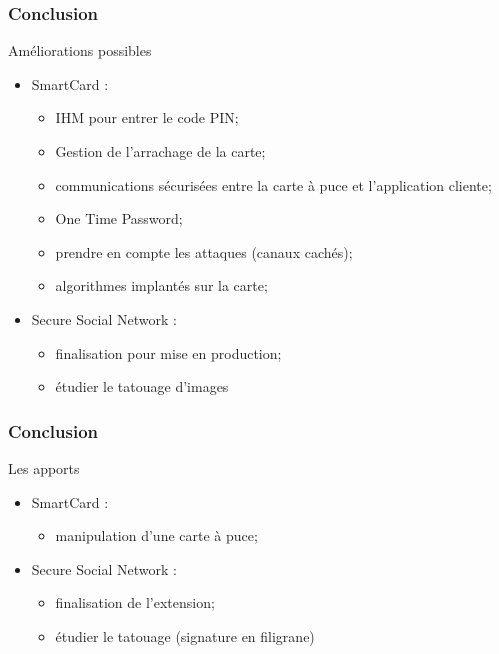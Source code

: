\documentclass{beamer}
\begin{document}
\begin{frame}
\frametitle{Conclusion}
\begin{block}{Améliorations possibles}
\begin{itemize}
    \item SmartCard : 
    \begin{itemize}
        \item IHM pour entrer le code PIN; %
        \item Gestion de l'arrachage de la carte; %
        \item communications sécurisées entre la carte à puce et l'application
            cliente;
        \item One Time Password;
        \item prendre en compte les attaques (canaux cachés);
        \item algorithmes implantés sur la carte;
    \end{itemize}
    \item Secure Social Network : 
        \begin{itemize}
           \item finalisation pour mise en production;
           \item étudier le tatouage d'images
        \end{itemize}
\end{itemize}
\end{block}
\end{frame}

\begin{frame}
\frametitle{Conclusion}
\begin{block}{Les apports}
\begin{itemize}
    \item SmartCard : 
    \begin{itemize}
        \item manipulation d'une carte à puce;
    \end{itemize}
    \item Secure Social Network : 
        \begin{itemize}
           \item finalisation de l'extension;
           \item étudier le tatouage (signature en filigrane)
        \end{itemize}
\end{itemize}
\end{block}
\end{frame}
\end{document}

